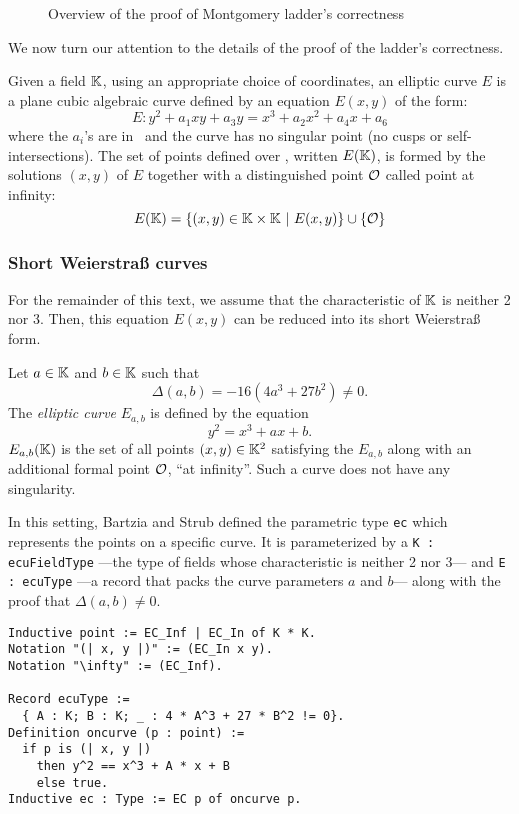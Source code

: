 \begin{figure}[h]
  \centering
  
  \caption{Overview of the proof of Montgomery ladder's correctness}
  \label{tikz:ProofHighLevel1}
\end{figure}

We now turn our attention to the details of the proof of the ladder's correctness.

\begin{dfn}
  Given a field $\mathbb{K}$,
  using an appropriate choice of coordinates,
  an elliptic curve $E$
  is a plane cubic algebraic curve defined by an equation $E(x,y)$ of the form:
  $$E : y^2 + a_1 xy + a_3 y = x^3 + a_2 x^2 + a_4 x + a_6$$
  where the $a_i$'s are in \K\ and the curve has no singular point (\ie no cusps
  or self-intersections). The set of points defined over \K, written $E(\mathbb{K})$, is formed by the
  solutions $(x,y)$ of $E$ together with a distinguished point $\mathcal{O}$ called point at infinity:
  $$E(\mathbb{K}) = \{ (x,y) \in \mathbb{K} \times \mathbb{K} ~|~E(x,y)\} \cup \{\mathcal{O}\}$$
\end{dfn}

\subsubsection{Short Weierstra{\ss} curves}
\label{subsec:ECC-Weierstrass}

For the remainder of this text, we assume that the characteristic of $\mathbb{K}$ is neither 2 nor 3.
Then, this equation $E(x,y)$ can be reduced into its short Weierstra{\ss} form.

\begin{dfn}
  Let $a \in \mathbb{K}$ and $b \in \mathbb{K}$ such that $$\Delta(a,b) = -16(4a^3 + 27b^2) \neq 0.$$
  The \textit{elliptic curve} $E_{a,b}$ is defined by the equation
  $$y^2 = x^3 + ax + b.$$
  $E_{a,b}(\mathbb{K})$ is the set of all points $(x,y) \in \mathbb{K}^2$ satisfying the $E_{a,b}$
  along with an additional formal point $\mathcal{O}$, ``at infinity''. Such a curve does not have any singularity.
\end{dfn}

In this setting, Bartzia and Strub defined the parametric type \texttt{ec} which
represents the points on a specific curve. It is parameterized by
a \texttt{K : ecuFieldType} ---the type of fields whose characteristic is neither 2 nor 3---
and \texttt{E : ecuType} ---a record that packs the curve parameters $a$ and $b$---
along with the proof that $\Delta(a,b) \neq 0$.
\begin{lstlisting}[language=Coq]
Inductive point := EC_Inf | EC_In of K * K.
Notation "(| x, y |)" := (EC_In x y).
Notation "\infty" := (EC_Inf).

Record ecuType :=
  { A : K; B : K; _ : 4 * A^3 + 27 * B^2 != 0}.
Definition oncurve (p : point) :=
  if p is (| x, y |)
    then y^2 == x^3 + A * x + B
    else true.
Inductive ec : Type := EC p of oncurve p.
\end{lstlisting}

